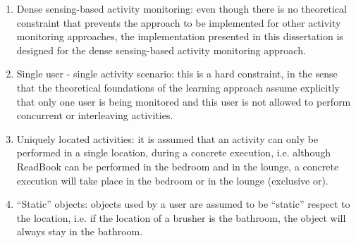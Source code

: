 \begin{enumerate}
 \item Dense sensing-based activity monitoring: even though there is no theoretical constraint that prevents the approach to be implemented for other activity monitoring approaches, the implementation presented in this dissertation is designed for the dense sensing-based activity monitoring approach. 
 \item Single user - single activity scenario: this is a hard constraint, in the sense that the theoretical foundations of the learning approach assume explicitly that only one user is being monitored and this user is not allowed to perform concurrent or interleaving activities.
 \item Uniquely located activities: it is assumed that an activity can only be performed in a single location, during a concrete execution, i.e. although ReadBook can be performed in the bedroom and in the lounge, a concrete execution will take place in the bedroom or in the lounge (exclusive or).
 \item ``Static'' objects: objects used by a user are assumed to be ``static'' respect to the location, i.e. if the location of a brusher is the bathroom, the object will always stay in the bathroom.
\end{enumerate}
